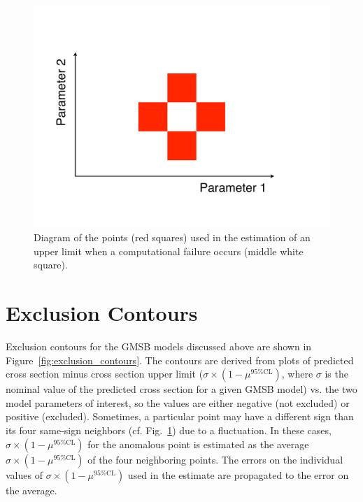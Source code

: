 \documentclass[dissertation.tex]{subfiles}
\begin{document}
\begin{figure}
	\centering
	\includegraphics[scale=0.3]{UL_estimation_points}
	\caption{Diagram of the points (red squares) used in the estimation of an upper limit when a computational failure occurs (middle white square).}
	\label{fig:UL_estimation_points}
\end{figure}

\section{Exclusion Contours}
\label{sec:Exclusion Contours}

Exclusion contours for the GMSB models discussed above are shown in Figure~\ref{fig:exclusion_contours}.  The contours are derived from plots of predicted cross section minus cross section upper limit ($\sigma\times(1 - \mu^{95\%\mathrm{CL}})$, where $\sigma$ is the nominal value of the predicted cross section for a given GMSB model) vs. the two model parameters of interest, so the values are either negative (not excluded) or positive (excluded).  Sometimes, a particular point may have a different sign than its four same-sign neighbors (cf. Fig.~\ref{fig:UL_estimation_points}) due to a fluctuation.  In these cases, $\sigma\times(1 - \mu^{95\%\mathrm{CL}})$ for the anomalous point is estimated as the average $\sigma\times(1 - \mu^{95\%\mathrm{CL}})$ of the four neighboring points.  The errors on the individual values of $\sigma\times(1 - \mu^{95\%\mathrm{CL}})$ used in the estimate are propagated to the error on the average.
\end{document}
